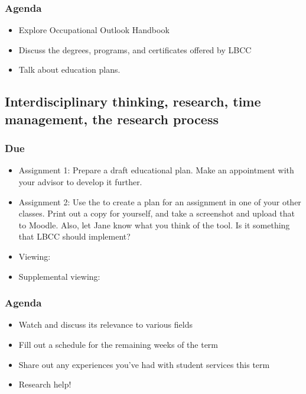 \documentclass[12pt,article,oneside]{memoir}
\begin{document}
\subsubsection{Agenda}
\begin{itemize}
 \item Explore Occupational Outlook Handbook
 \item Discuss the degrees, programs, and certificates offered by LBCC
\item Talk about education plans.
\end{itemize}



\subsection{Interdisciplinary thinking, research, time management, the research process}
\subsubsection{Due}
\begin{itemize}
 \item Assignment 1: Prepare a draft educational plan.  Make an appointment with your advisor to develop it further.
 \item Assignment 2: Use the  to create a plan for an assignment in one of your other classes.  Print out a copy for yourself, and take a screenshot and upload that to Moodle.  Also, let Jane know what you think of the tool. Is it something that LBCC should implement?
 \item Viewing: \cite{decipher}
 \item Supplemental viewing: \cite{gen-ed}
\end{itemize}


\subsubsection{Agenda}
\begin{itemize}
 \item Watch \cite{lasers} and discuss its relevance to various fields
 \item Fill out a schedule for the remaining weeks of the term
 \item Share out any experiences you've had with student services this term
 \item Research help!
\end{itemize}
\end{document}
